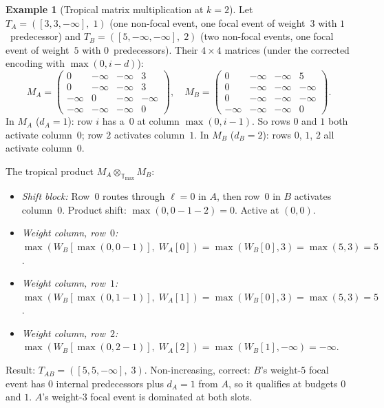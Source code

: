 \documentclass[11pt]{article}
\theoremstyle{plain}
\theoremstyle{definition}
\newtheorem{example}[theorem]{Example}
\theoremstyle{remark}
\newcommand{\Tmax}{\mathbb{T}_{\max}}
\begin{document}
\begin{example}[Tropical matrix multiplication at $k = 2$]
\label{ex:matrix-k2}
Let $T_A = ([3, 3, -\infty],\; 1)$ (one non-focal event, one focal
event of weight~$3$ with $1$~predecessor) and $T_B = ([5, -\infty,
-\infty],\; 2)$ (two non-focal events, one focal event of weight~$5$
with $0$~predecessors).  Their $4 \times 4$ matrices (under the
corrected encoding with $\max(0, i - d)$):
\[
  M_A = \begin{pmatrix}
    0 & -\infty & -\infty & 3 \\
    0 & -\infty & -\infty & 3 \\
    -\infty & 0 & -\infty & -\infty \\
    -\infty & -\infty & -\infty & 0
  \end{pmatrix},
  \quad
  M_B = \begin{pmatrix}
    0 & -\infty & -\infty & 5 \\
    0 & -\infty & -\infty & -\infty \\
    0 & -\infty & -\infty & -\infty \\
    -\infty & -\infty & -\infty & 0
  \end{pmatrix}.
\]
In $M_A$ ($d_A = 1$): row $i$ has a~$0$ at column $\max(0, i - 1)$.
So rows $0$ and $1$ both activate column~$0$; row $2$ activates
column~$1$.  In $M_B$ ($d_B = 2$): rows $0$, $1$, $2$ all activate
column~$0$.

\smallskip
The tropical product $M_A \otimes_{\Tmax} M_B$:
\begin{itemize}[nosep]
  \item \emph{Shift block:} Row~$0$ routes through $\ell = 0$ in $A$,
    then row~$0$ in $B$ activates column~$0$.  Product shift:
    $\max(0, 0 - 1 - 2) = 0$.  Active at $(0,0)$.
  \item \emph{Weight column, row~$0$:}
    $\max(W_B[\max(0, 0{-}1)],\; W_A[0]) = \max(W_B[0], 3) =
    \max(5, 3) = 5$.
  \item \emph{Weight column, row~$1$:}
    $\max(W_B[\max(0, 1{-}1)],\; W_A[1]) = \max(W_B[0], 3) =
    \max(5, 3) = 5$.
  \item \emph{Weight column, row~$2$:}
    $\max(W_B[\max(0, 2{-}1)],\; W_A[2]) = \max(W_B[1], -\infty) =
    -\infty$.
\end{itemize}
Result: $T_{AB} = ([5, 5, -\infty],\; 3)$.  Non-increasing, correct:
$B$'s weight-$5$ focal event has $0$ internal predecessors plus $d_A =
1$ from $A$, so it qualifies at budgets $0$ and $1$.  $A$'s weight-$3$
focal event is dominated at both slots.
\end{example}
\end{document}
